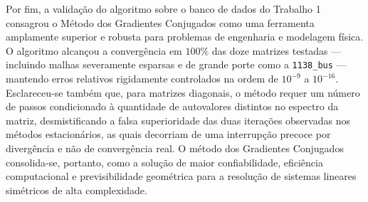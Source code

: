 \documentclass[12pt,a4paper]{article}
\begin{document}
Por fim, a validação do algoritmo sobre o banco de dados do Trabalho 1 consagrou o Método dos Gradientes Conjugados como uma ferramenta amplamente superior e robusta para problemas de engenharia e modelagem física. O algoritmo alcançou a convergência em $100\%$ das doze matrizes testadas --- incluindo malhas severamente esparsas e de grande porte como a \texttt{1138\_bus} --- mantendo erros relativos rigidamente controlados na ordem de $10^{-9}$ a $10^{-16}$. Esclareceu-se também que, para matrizes diagonais, o método requer um número de passos condicionado à quantidade de autovalores distintos no espectro da matriz, desmistificando a falsa superioridade das duas iterações observadas nos métodos estacionários, as quais decorriam de uma interrupção precoce por divergência e não de convergência real. O método dos Gradientes Conjugados consolida-se, portanto, como a solução de maior confiabilidade, eficiência computacional e previsibilidade geométrica para a resolução de sistemas lineares simétricos de alta complexidade.
\end{document}
